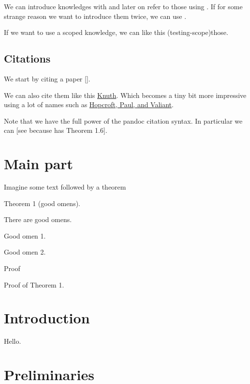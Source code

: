 \documentclass[a4paper,anonymous,UKenglish,cleveref,autoref,thm-restate]{lipics-v2021}
\begin{document}
We can introduce knowledges with  and later on refer to
those using . If for some strange reason we want to introduce
them twice, we can use .

If we want to use a scoped knowledge, we can like this
\kl(testing-scope){those}.

\subsection{Citations}\label{citations}

We start by citing a paper {[}\cite{DBLP:journals/cacm/Knuth74}{]}.

We can also cite them like this
\nocite{DBLP:journals/cacm/Knuth74}\hyperlink{cite.DBLP:journals/cacm/Knuth74}{Knuth}.
Which becomes a tiny bit more impressive using a lot of names such as
\nocite{DBLP:conf/focs/HopcroftPV75}\hyperlink{cite.DBLP:conf/focs/HopcroftPV75}{Hopcroft,
Paul, and Valiant}.

Note that we have the full power of the pandoc citation syntax. In
particular we can
{[}see \cite{DBLP:journals/cacm/Knuth74} because \cite{DBLP:conf/focs/HopcroftPV75} 
has Theorem 1.6{]}.

\section{Main part}\label{main-part}

Imagine some text followed by a theorem

{Theorem 1} (good omens).

There are good omens.

Good omen 1.

Good omen 2.

Proof

Proof of Theorem 1.

\section{Introduction}\label{introduction-1}

Hello.

\section{Preliminaries}\label{preliminaries}


\end{document}
